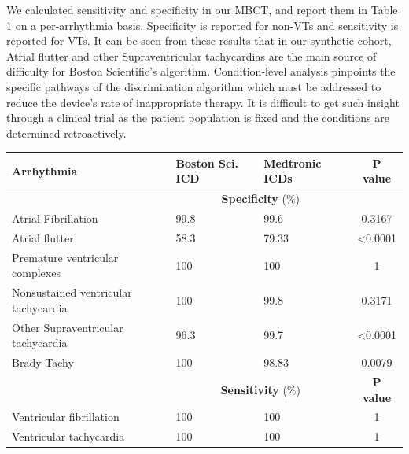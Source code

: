 We calculated sensitivity and specificity in our MBCT, and report them in Table \ref{table:vtsvt} on a per-arrhythmia basis.
Specificity is reported for non-\acp{VT} and sensitivity is reported for VTs.
It can be seen from these results that in our synthetic cohort, Atrial flutter and other Supraventricular tachycardias are the main source of difficulty for Boston Scientific's algorithm. 
Condition-level analysis pinpoints the specific pathways of the discrimination algorithm which must be addressed to reduce the device's rate of inappropriate therapy. 
It is difficult to get such insight through a clinical trial as the patient population is fixed and the conditions are determined retroactively. 

\begin{table}[t]
	\vspace{-10pt}
\begin{tabular}{|p{2.8cm}|p{1.5cm}|p{1.5cm}|c|}
	\hline Arrhythmia & Boston Sci. ICD & Medtronic ICDs  & P value \\ 
	\hline &	\multicolumn{2}{|c|}{\textbf{Specificity} (\%)}& \\
	\hline Atrial Fibrillation & 99.8 & 99.6 & 0.3167 \\ 
	\hline \cellcolor{blue!25} Atrial flutter & 58.3 & 79.33 & <0.0001 \\ 
	\hline Premature ventricular complexes & 100 & 100 & 1 \\ 
	\hline Nonsustained ventricular tachycardia & 100 & 99.8 & 0.3171 \\ 
	\hline \cellcolor{blue!25} Other Supraventricular tachycardia & 96.3 & 99.7 & <0.0001 \\ 
	\hline Brady-Tachy & 100 & 98.83 & 0.0079 \\ 
		\hline
	\hline &	\multicolumn{2}{|c|}{\textbf{Sensitivity} (\%)} & \textbf{P value}\\
	\hline Ventricular fibrillation & 100 & 100 & 1 \\ 
	\hline Ventricular tachycardia & 100 & 100 & 1 \\ 
	\hline 
\end{tabular} 
\vspace{-10pt}
\label{table:vtsvt}
\end{table}